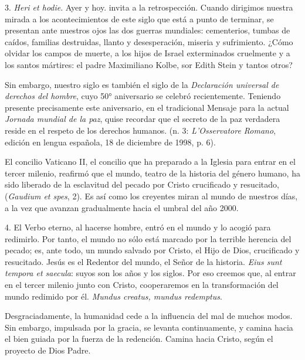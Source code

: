 3. \emph{Heri et hodie}. Ayer y hoy.  invita a la retrospección. Cuando dirigimos nuestra mirada a los acontecimientos de este siglo que está a punto de terminar, se presentan ante nuestros ojos las dos guerras mundiales: cementerios, tumbas de caídos, familias destruidas, llanto y desesperación, miseria y sufrimiento. ¿Cómo olvidar los campos de muerte, a los hijos de Israel exterminados cruelmente y a los santos mártires: el padre Maximiliano Kolbe, sor Edith Stein y tantos otros?

Sin embargo, nuestro siglo es también el siglo de la \emph{Declaración universal de derechos del hombre}, cuyo 50° aniversario se celebró recientemente. Teniendo presente precisamente este aniversario, en el tradicional Mensaje para la actual \emph{Jornada mundial de la paz}, quise recordar que el secreto de la paz verdadera reside en el respeto de los derechos humanos.  (n. 3: \emph{L'Osservatore Romano}, edición en lengua española, 18 de diciembre de 1998, p. 6).

El concilio Vaticano II, el concilio que ha preparado a la Iglesia para entrar en el tercer milenio, reafirmó que el mundo, teatro de la historia del género humano, ha sido liberado de la esclavitud del pecado por Cristo crucificado y resucitado,  (\emph{Gaudium et spes}, 2). Es así como los creyentes miran al mundo de nuestros días, a la vez que avanzan gradualmente hacia el umbral del año 2000.

4. El Verbo eterno, al hacerse hombre, entró en el mundo y lo acogió para redimirlo. Por tanto, el mundo no sólo está marcado por la terrible herencia del pecado; es, ante todo, un mundo salvado por Cristo, el Hijo de Dios, crucificado y resucitado. Jesús es el Redentor del mundo, el Señor de la historia. \emph{Eius sunt tempora et saecula}: suyos son los años y los siglos. Por eso creemos que, al entrar en el tercer milenio junto con Cristo, cooperaremos en la transformación del mundo redimido por él. \emph{Mundus creatus, mundus redemptus}.

Desgraciadamente, la humanidad cede a la influencia del mal de muchos modos. Sin embargo, impulsada por la gracia, se levanta continuamente, y camina hacia el bien guiada por la fuerza de la redención. Camina hacia Cristo, según el proyecto de Dios Padre.

